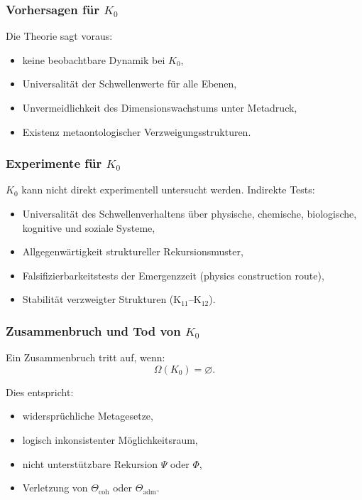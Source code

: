 \subsubsection{Vorhersagen für \texorpdfstring{$K_0$}{K_0}}

Die Theorie sagt voraus:
\begin{itemize}
    \item keine beobachtbare Dynamik bei $K_0$,
    \item Universalität der Schwellenwerte für alle Ebenen,
    \item Unvermeidlichkeit des Dimensionswachstums unter Metadruck,
    \item Existenz metaontologischer Verzweigungsstrukturen.
\end{itemize}

\subsubsection{Experimente für \texorpdfstring{$K_0$}{K_0}}

$K_0$ kann nicht direkt experimentell untersucht werden.
Indirekte Tests:
\begin{itemize}
    \item Universalität des Schwellenverhaltens über physische,
          chemische, biologische, kognitive und soziale Systeme,
    \item Allgegenwärtigkeit struktureller Rekursionsmuster,
    \item Falsifizierbarkeitstests der Emergenzzeit (physics construction route),
    \item Stabilität verzweigter Strukturen (K$_{11}$–K$_{12}$).
\end{itemize}

\subsubsection{Zusammenbruch und Tod von \texorpdfstring{$K_0$}{K_0}}

Ein Zusammenbruch tritt auf, wenn:
\[
\Omega(K_0) = \varnothing.
\]

Dies entspricht:
\begin{itemize}
    \item widersprüchliche Metagesetze,
    \item logisch inkonsistenter Möglichkeitsraum,
    \item nicht unterstützbare Rekursion $\Psi$ oder $\Phi$,
    \item Verletzung von $\Theta_{\mathrm{coh}}$ oder $\Theta_{\mathrm{adm}}$.
\end{itemize}

